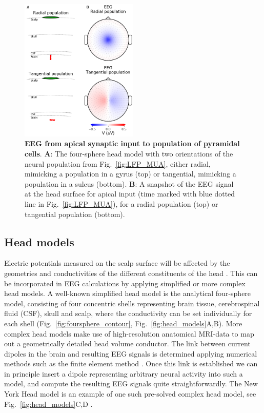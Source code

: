 \documentclass[preprint,11pt,authoryear]{elsarticle}
\begin{document}
\begin{figure}[!ht]
\begin{center}
\includegraphics[width=0.5\textwidth]{population_EEG_MEG_cut.png}
\end{center}
\caption{\textbf{EEG from apical synaptic input to population of pyramidal cells}.
{\bf A}: The four-sphere head model with two orientations of the neural population from Fig.~\ref{fig:LFP_MUA}, either radial, mimicking a population in a gyrus (top) or tangential, mimicking a population in a sulcus (bottom).
{\bf B}: A snapshot of the EEG signal at the head surface for apical input (time marked with blue dotted line in Fig.~\ref{fig:LFP_MUA}), for a radial population (top) or tangential population (bottom).
}
\label{fig:EEG_MEG}
\end{figure}

\subsection{Head models}
Electric potentials measured on the scalp surface will be affected by the geometries and conductivities of the different constituents of the head \citep{Nunez2006}. This can be incorporated in EEG calculations by applying simplified or more complex head models.
A well-known simplified head model is the analytical four-sphere model, consisting of four concentric shells representing brain tissue, cerebrospinal fluid (CSF), skull and scalp, where the conductivity can be set individually for each shell \citep{Naess2017, Srinivasan1998, Nunez2006} (Fig.~\ref{fig:foursphere_contour}, Fig.~\ref{fig:head_models}A,B).
More complex head models make use of high-resolution anatomical MRI-data to map out a geometrically detailed head volume conductor. The link between current dipoles in the brain and resulting EEG signals is determined applying numerical methods such as the finite element method \citep{Larson2013, Logg2012}. Once this link is established we can in principle insert a dipole representing arbitrary neural activity into such a model, and compute the resulting EEG signals quite straightforwardly. The New York Head model is an example of one such pre-solved complex head model, see Fig.~\ref{fig:head_models}C,D \citep{Huang2016}.
\end{document}
